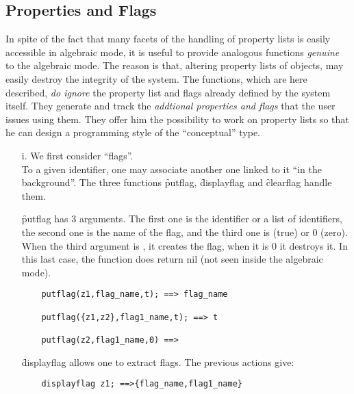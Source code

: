 \subsection{Properties and Flags}
In spite of the fact that many facets of the handling of
property lists is easily accessible in algebraic mode, it is useful to
provide analogous functions \emph{genuine} to the algebraic mode. The reason is
that, altering property lists of objects, may easily destroy the integrity
of the system. The functions, which are here described, \emph{do ignore}
the property list and flags already defined by the system itself. They
generate and track the \emph{addtional properties and flags} that the user
issues using them. They offer him
the  possibility to work on property lists so
that he can design a programming style of the ``conceptual'' type.
\begin{itemize}
\item[i.] We first consider ``flags''. \\
\hypertarget{operator:PUTFLAG}{}
\hypertarget{operator:DISPLAYFLAG}{}
\hypertarget{operator:CLEARFLAG}{}
To a given identifier, one may
associate another one linked to it ``in the background''. The  three
functions \f{putflag}, \f{displayflag} and \f{clearflag} handle them.

\f{putflag} has 3 arguments. The first one is the identifier or a list
of identifiers, the second one is the name of the flag,
and the third one is  (true) or 0 (zero).
When the third argument is , it creates the flag, when it is 0 it
destroys it. In this last case, the function does return nil (not seen 
inside the algebraic mode).
\begin{verbatim}
    putflag(z1,flag_name,t); ==> flag_name

    putflag({z1,z2},flag1_name,t); ==> t

    putflag(z2,flag1_name,0) ==>
\end{verbatim}
\f{displayflag} allows one to extract flags. The previous actions give:
\begin{verbatim}
    displayflag z1; ==>{flag_name,flag1_name}


\end{verbatim}
\end{itemize}
